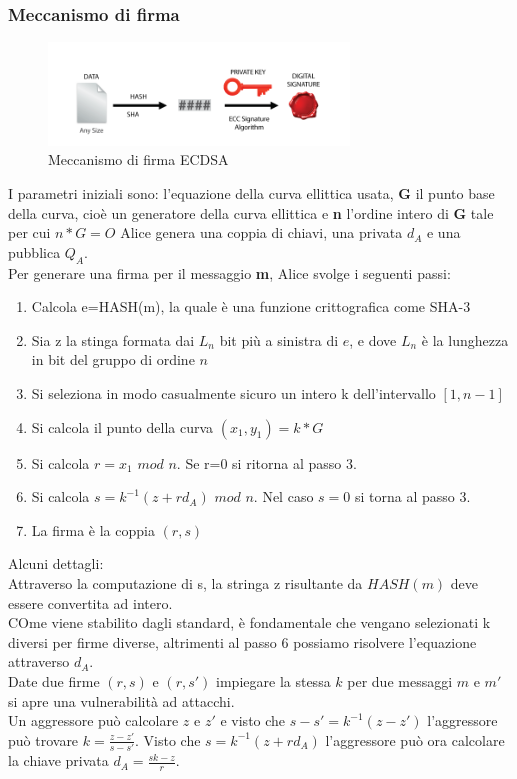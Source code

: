 \documentclass[a4paper,11pt]{report}
\begin{document}
\subsubsection{Meccanismo di firma}
\begin{figure}[htbp] 
\begin{center}
\includegraphics[width=8cm]{img/s.png} 
\end{center}
\caption{Meccanismo di firma ECDSA}
\end{figure}
I parametri iniziali sono: l'equazione della curva ellittica usata, \textbf{G} il punto base della curva, cioè un generatore della curva ellittica e \textbf{n} l'ordine intero di \textbf{G} tale per cui $n*G=O$  Alice genera una coppia di chiavi, una privata \textbf{$d_{A}$} e una pubblica \textbf{$Q_{A}$}.\\ Per generare una firma per il messaggio \textbf{m}, Alice svolge i seguenti passi:
\begin{enumerate}
\item Calcola e=HASH(m), la quale è una funzione crittografica come SHA-3
\item Sia z la stinga formata dai $L_{n}$ bit più a sinistra di $e$, e dove $L_{n}$ è la lunghezza in bit del gruppo di ordine $n$
\item Si seleziona in modo casualmente sicuro un intero k dell'intervallo $[1,n-1]$
\item Si calcola il punto della curva $(x_{1},y_{1}) = k*G$
\item Si calcola $r=x_{1}$ $mod$ $n$. Se r=0 si ritorna al passo 3.
\item Si calcola $s=k^{-1}(z+rd_{A})$ $mod$ $n$. Nel caso $s=0$ si torna al passo 3.
\item La firma è la coppia $(r,s)$ 
\end{enumerate}

Alcuni dettagli:\\
Attraverso la computazione di s, la stringa z risultante da $HASH(m)$ deve essere convertita ad intero.\\
COme viene stabilito dagli standard, è fondamentale che vengano selezionati k diversi per firme diverse, altrimenti al passo 6 possiamo risolvere l'equazione attraverso $d_{A}$.\\
Date due firme $(r,s)$ e $(r,s')$ impiegare la stessa $k$ per due messaggi $m$ e $m'$ si apre una vulnerabilità ad attacchi.\\
Un aggressore può calcolare $z$ e $z'$ e visto che $s-s'=k^{-1}(z-z')$ l'aggressore può trovare $k=\frac{z-z'}{s-s'}$. Visto che $s=k^{-1}(z+rd_{A})$ l'aggressore può ora calcolare la chiave privata $d_{A}=\frac{sk-z}{r}$.
\end{document}
